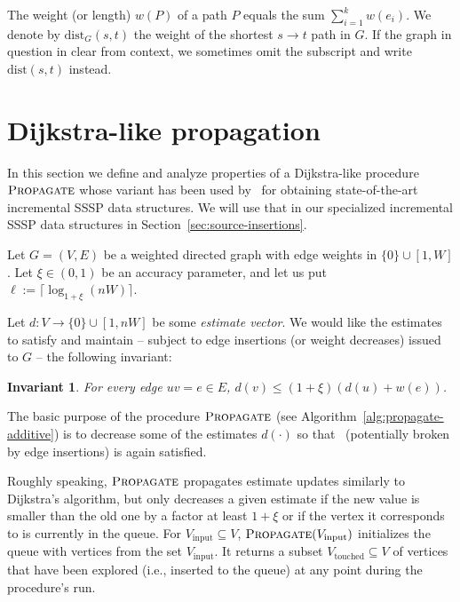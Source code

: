 \documentclass[11pt,letterpaper]{article}
\theoremstyle{plain}
\newtheorem{invariant}[theorem]{Invariant}
\newcommand{\dist}{\mathrm{dist}}
\newcommand{\wei}{w}
\DeclareMathOperator*{\PD}{\textsc{Propagate}}
\begin{document}
The weight (or length) $\wei(P)$ of a path $P$ equals the sum $\sum_{i=1}^k\wei(e_i)$.
We denote by $\dist_G(s,t)$ the weight of the shortest $s\to t$ path in $G$. 
If the graph in question in clear from context, we sometimes omit the subscript and write $\dist(s,t)$ instead.

\section{Dijkstra-like propagation}\label{sec:propagate}
\newcommand{\epsp}{\xi}
\newcommand{\Vinput}{V_{\mathrm{input}}}
\newcommand{\Vtouch}{V_{\mathrm{touched}}}
In this section we define and analyze properties of a Dijkstra-like procedure $\PD$ whose variant has been
used by~\cite{ChechikZ21,KyngMG22} for obtaining state-of-the-art incremental SSSP data structures. We will use that in our specialized incremental SSSP data structures in Section~\ref{sec:source-insertions}.

Let $G=(V,E)$ be a weighted directed graph with edge weights in $\{0\}\cup[1,W]$.
Let $\epsp\in (0,1)$ be an accuracy parameter, and let us put $\ell:=\lceil{\log_{1+\epsp}(nW)}\rceil$.

Let $d:V\to \{0\}\cup [1,nW]$ be some \emph{estimate vector}. We would like the estimates to satisfy and maintain -- 
subject to edge insertions (or weight decreases) issued to $G$ --
the following invariant:
\begin{invariant}\label{slack-inv}
For every edge $uv=e\in E$, $d(v)\leq (1+\epsp)(d(u)+\wei(e))$.
\end{invariant}
The basic purpose of the procedure $\PD$ 
(see Algorithm~\ref{alg:propagate-additive}) is to decrease some of the estimates $d(\cdot)$ so that~
(potentially broken by edge insertions) is again satisfied.

Roughly speaking, $\PD$ propagates estimate updates similarly to Dijkstra's algorithm, but only decreases a given estimate if the new value is smaller than the old one by a factor at least $1+\epsp$ or if the vertex it corresponds to is currently in the queue.
For $\Vinput \subseteq V$, $\PD(\Vinput)$ initializes the queue with vertices from the set $\Vinput$.
It returns a subset $\Vtouch \subseteq V$ of vertices that have been explored (i.e., inserted to the queue) at any point during the procedure's run.
\end{document}
